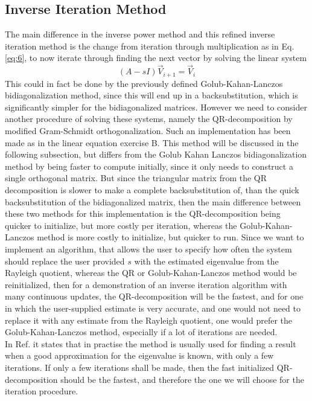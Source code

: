 \documentclass[twocolumn]{article}
\begin{document}
\subsection{\label{sec:4} Inverse Iteration Method}
The main difference in the inverse power method and this refined inverse iteration method is the change from iteration through multiplication as in Eq. \eqref{eq:6}, to now iterate through finding the next vector by solving the linear system
\begin{equation}
\left(A - sI\right) \vec{V}_{i+1} =  \vec{V}_i \label{eq:7}
\end{equation}
This could in fact be done by the previously defined Golub-Kahan-Lanczos bidiagonalization method, since this will end up in a backsubstitution, which is significantly simpler for the bidiagonalized matrices. However we need to consider another procedure of solving these systems, namely the QR-decomposition by modified Gram-Schmidt orthogonalization. Such an implementation has been made as in the linear equation exercise B. This method will be discussed in the following subsection, but differs from the Golub Kahan Lanczos bidiagonalization method by being faster to compute initially, since it only needs to construct a single orthogonal matrix. But since the triangular matrix from the QR decomposition is slower to make a complete backsubstitution of, than the quick backsubstitution of the bidiagonalized matrix, then the main difference between these two methods for this implementation is the QR-decomposition being quicker to initialize, but more costly per iteration, whereas the Golub-Kahan-Lanczos method is more costly to initialize, but quicker to run. Since we want to implement an algorithm, that allows the user to specify how often the system should replace the user provided $s$ with the estimated eigenvalue from the Rayleigh quotient, whereas the QR or Golub-Kahan-Lanczos method would be reinitialized, then for a demonstration of an inverse iteration algorithm with many continuous updates, the QR-decomposition will be the fastest, and for one in which the user-supplied estimate is very accurate, and one would not need to replace it with any estimate from the Rayleigh quotient, one would prefer the Golub-Kahan-Lanczos method, especially if a lot of iterations are needed. \\

In Ref. \cite[Chapter 12 - Eigenvalues 2: Power methods and Krylov subspace methods]{Dmi} it states that in practise the method is usually used for finding a result when a good approximation for the eigenvalue is known, with only a few iterations. If only a few iterations shall be made, then the fast initialized QR-decomposition should be the fastest, and therefore the one we will choose for the iteration procedure.
\end{document}
